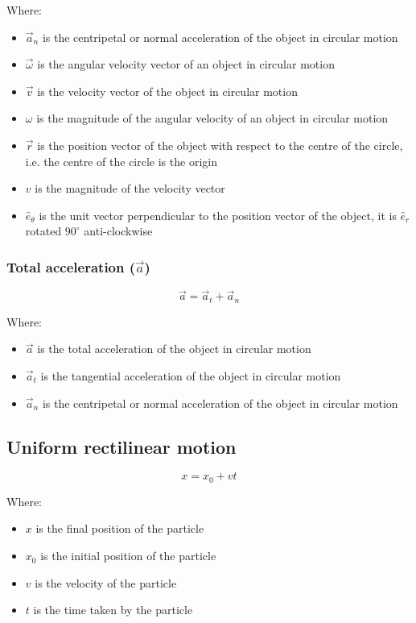 \documentclass[11pt]{article}
\begin{document}
Where:
\begin{itemize}
\item \(\vec{a}_n\) is the centripetal or normal acceleration of the object in circular motion
\item \(\vec{\omega}\) is the angular velocity vector of an object in circular motion
\item \(\vec{v}\) is the velocity vector of the object in circular motion
\item \(\omega\) is the magnitude of the angular velocity of an object in circular motion
\item \(\vec{r}\) is the position vector of the object with respect to the centre of the circle, i.e. the centre of the circle is the origin
\item \(v\) is the magnitude of the velocity vector
\item \(\hat{e}_{\theta}\) is the unit vector perpendicular to the position vector of the object, it is \(\hat{e}_r\) rotated \(90^{\circ}\) anti-clockwise
\end{itemize}
\subsubsection{Total acceleration (\(\vec{a}\))}
\label{sec:org4472f66}
\[\vec{a} = \vec{a}_t + \vec{a}_n\]

Where:
\begin{itemize}
\item \(\vec{a}\) is the total acceleration of the object in circular motion
\item \(\vec{a}_t\) is the tangential acceleration of the object in circular motion
\item \(\vec{a}_n\) is the centripetal or normal acceleration of the object in circular motion
\end{itemize}
\subsection{Uniform rectilinear motion}
\label{sec:org21f014b}
\[x = x_0 + vt\]

Where:
\begin{itemize}
\item \(x\) is the final position of the particle
\item \(x_0\) is the initial position of the particle
\item \(v\) is the velocity of the particle
\item \(t\) is the time taken by the particle
\end{itemize}
\end{document}

